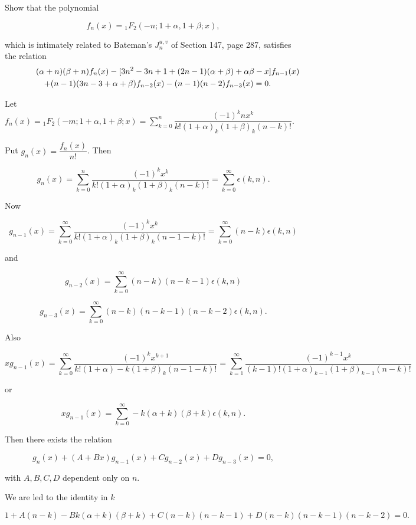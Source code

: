 \begin{problem}\label{problem4chapter14}
Show that the polynomial

$$f_n(x) = {}_1F_2(-n;1+\alpha,1+\beta;x),$$

which is intimately related to Bateman's $J_n^{u,v}$ of Section 147, page 287, satisfies the relation
\begin{eqnarray*}
\lefteqn{(\alpha+n)(\beta+n)f_n(x) - [3n^2-3n+1+(2n-1)(\alpha+\beta)+\alpha \beta-x]f_{n-1}(x)}\\
& & +(n-1)(3n-3+\alpha+\beta)f_{n-2}(x)-(n-1)(n-2)f_{n-3}(x)=0.
\end{eqnarray*}
\end{problem}
\begin{solution}
Let $f_n(x) = {}_1F_2(-m;1+\alpha,1+\beta;x) = \displaystyle\sum_{k=0}^n \dfrac{(-1)^k n x^k}{k! (1+\alpha)_k (1+\beta)_k(n-k)!}$.

Put $g_n(x) = \dfrac{f_n(x)}{n!}$. Then

$$g_n(x) = \displaystyle\sum_{k=0}^n \dfrac{(-1)^k x^k}{k! (1+\alpha)_k (1+\beta)_k(n-k)!} = \displaystyle\sum_{k=0}^{\infty} \epsilon(k,n).$$

Now 

$$g_{n-1}(x) = \displaystyle\sum_{k=0}^{\infty} \dfrac{(-1)^k x^k}{k!(1+\alpha)_k(1+\beta)_k(n-1-k)!} = \displaystyle\sum_{k=0}^{\infty} (n-k) \epsilon(k,n)$$

and

$$g_{n-2}(x) = \displaystyle\sum_{k=0}^{\infty} (n-k)(n-k-1) \epsilon(k,n)$$

$$g_{n-3}(x) = \displaystyle\sum_{k=0}^{\infty} (n-k)(n-k-1)(n-k-2) \epsilon(k,n).$$

Also

$$x g_{n-1}(x) = \displaystyle\sum_{k=0}^{\infty} \dfrac{(-1)^k x^{k+1}}{k! (1+\alpha)-k (1+\beta)_k (n-1-k)!} = \displaystyle\sum_{k=1}^{\infty} \dfrac{(-1)^{k-1} x^k}{(k-1)! (1+\alpha)_{k-1} (1+\beta)_{k-1} (n-k)!}$$

or

$$x g_{n-1}(x) = \displaystyle\sum_{k=0}^{\infty} -k(\alpha+k)(\beta+k)\epsilon(k,n).$$

Then there exists the relation

$$g_n(x) + (A+Bx)g_{n-1}(x) + Cg_{n-2}(x) + Dg_{n-3}(x) =0,$$

with $A,B,C,D$ dependent only on $n$.

We are led to the identity in $k$

$$1+A(n-k)-Bk(\alpha+k)(\beta+k) + C(n-k)(n-k-1)+D(n-k)(n-k-1)(n-k-2)=0.$$


\end{solution}
